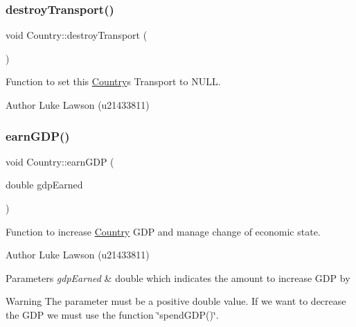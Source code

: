 \subsubsection{\texorpdfstring{destroyTransport()}{destroyTransport()}}
{\footnotesize\ttfamily void Country\+::destroy\+Transport (\begin{DoxyParamCaption}{ }\end{DoxyParamCaption})}



Function to set this \mbox{\hyperlink{class_country}{Country}}\textquotesingle{}s Transport to N\+U\+LL. 

\begin{DoxyAuthor}{Author}
Luke Lawson (u21433811) 
\end{DoxyAuthor}
\mbox{\label{class_country_af7a71e97969c6d107831785e868e2649}} 
\subsubsection{\texorpdfstring{earnGDP()}{earnGDP()}}
{\footnotesize\ttfamily void Country\+::earn\+G\+DP (\begin{DoxyParamCaption}\item[{double}]{gdp\+Earned }\end{DoxyParamCaption})}



Function to increase \mbox{\hyperlink{class_country}{Country}} G\+DP and manage change of economic state. 

\begin{DoxyAuthor}{Author}
Luke Lawson (u21433811) 
\end{DoxyAuthor}

\begin{DoxyParams}{Parameters}
{\em gdp\+Earned} & double which indicates the amount to increase G\+DP by \\
\hline
\end{DoxyParams}
\begin{DoxyWarning}{Warning}
The parameter must be a positive double value. If we want to decrease the G\+DP we must use the function \char`\"{}spend\+G\+D\+P()\char`\"{}. 
\end{DoxyWarning}
\mbox{\label{class_country_ad034f149b2f19a246dc367b05ae1dedf}} 

